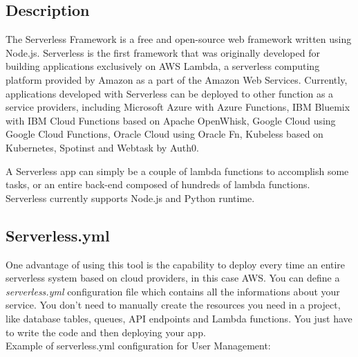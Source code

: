 \newpage
{}
\subsection{Description}
The Serverless Framework is a free and open-source web framework written using Node.js. Serverless is the first framework that was originally developed for building applications exclusively on AWS Lambda, a serverless computing platform provided by Amazon as a part of the Amazon Web Services. Currently, applications developed with Serverless can be deployed to other function as a service providers, including Microsoft Azure with Azure Functions, IBM Bluemix with IBM Cloud Functions based on Apache OpenWhisk, Google Cloud using Google Cloud Functions, Oracle Cloud using Oracle Fn, Kubeless based on Kubernetes, Spotinst and Webtask by Auth0.

A Serverless app can simply be a couple of lambda functions to accomplish some tasks, or an entire back-end composed of hundreds of lambda functions. Serverless currently supports Node.js and Python runtime.

\subsection{Serverless.yml}
One advantage of using this tool is the capability to deploy every time an entire serverless system based on cloud providers, in this case AWS. You can define a \emph{serverless.yml} configuration file which contains all the informations about your service. You don't need to manually create the resources you need in a project, like database tables, queues, API endpoints and Lambda functions. You just have to write the code and then deploying your app.\\

Example of serverless.yml configuration for User Management:\\

